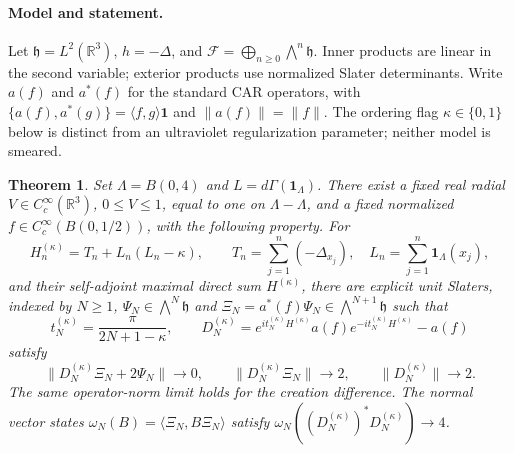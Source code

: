 \documentclass[11pt]{article}
\newtheorem{theorem}{Theorem}
\newcommand{\F}{\mathcal F}
\newcommand{\id}{\mathbf 1}
\begin{document}
\paragraph{Model and statement.}
Let $\mathfrak h=L^2(\mathbb R^3)$, $h=-\Delta$, and
$\F=\bigoplus_{n\geq0}\bigwedge^n\mathfrak h$. Inner products are linear in
the second variable; exterior products use normalized Slater determinants.
Write $a(f)$ and $a^*(f)$ for the standard CAR operators, with
$\{a(f),a^*(g)\}=\langle f,g\rangle\id$ and $\|a(f)\|=\|f\|$.
The ordering flag $\kappa\in\{0,1\}$ below is distinct from an ultraviolet
regularization parameter; neither model is smeared.

\newpage
\begin{theorem}\label{thm}
Set $\Lambda=B(0,4)$ and $L=d\Gamma(\id_\Lambda)$. There exist a fixed
real radial $V\in C_c^\infty(\mathbb R^3)$, $0\leq V\leq1$, equal to one
on $\Lambda-\Lambda$, and a fixed normalized
$f\in C_c^\infty(B(0,1/2))$, with the following property. For
\begin{equation}\label{H}
 H^{(\kappa)}_n=T_n+L_n(L_n-\kappa),\qquad
 T_n=\sum_{j=1}^n(-\Delta_{x_j}),\quad
 L_n=\sum_{j=1}^n\id_\Lambda(x_j),
\end{equation}
and their self-adjoint maximal direct sum $H^{(\kappa)}$, there are explicit
unit Slaters, indexed by $N\geq1$, $\Psi_N\in\bigwedge^N\mathfrak h$ and
$\Xi_N=a^*(f)\Psi_N\in\bigwedge^{N+1}\mathfrak h$ such that
\begin{equation}\label{times}
 t_N^{(\kappa)}=\frac{\pi}{2N+1-\kappa},\qquad
 D_N^{(\kappa)}=e^{it_N^{(\kappa)}H^{(\kappa)}}a(f)
               e^{-it_N^{(\kappa)}H^{(\kappa)}}-a(f)
\end{equation}
satisfy
\begin{equation}\label{limits}
 \|D_N^{(\kappa)}\Xi_N+2\Psi_N\|\longrightarrow0,\qquad
 \|D_N^{(\kappa)}\Xi_N\|\longrightarrow2,\qquad
 \|D_N^{(\kappa)}\|\longrightarrow2 .
\end{equation}
The same operator-norm limit holds for the creation difference. The normal
vector states $\omega_N(B)=\langle\Xi_N,B\Xi_N\rangle$ satisfy
$\omega_N((D_N^{(\kappa)})^*D_N^{(\kappa)})\to4$.
\end{theorem}
\end{document}
